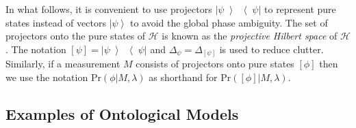 \documentclass[DIV=calc,fontsize=12pt]{scrartcl} %
\theoremstyle{definition}
\theoremstyle{plain}
\newcommand{\Ket}[1]{\ensuremath{\left \vert #1 \right \rangle}}
\newcommand{\KetBra}[2]{\ensuremath{\left \vert #1 \middle \rangle
\middle \langle #2 \right \vert}}
\newcommand{\Proj}[1]{\ensuremath{\left [ #1 \right ]}}
\begin{document}
In what follows, it is convenient to use projectors
$\KetBra{\psi}{\psi}$ to represent pure states instead of vectors
$\Ket{\psi}$ to avoid the global phase ambiguity.  The set of
projectors onto the pure states of $\mathcal{H}$ is known as the
\emph{projective Hilbert space} of $\mathcal{H}$.  The notation
$\Proj{\psi} = \KetBra{\psi}{\psi}$ and $\Delta_{\psi} =
\Delta_{\Proj{\psi}}$ is used to reduce clutter.  Similarly, if a
measurement $M$ consists of projectors onto pure states $\Proj{\phi}$
then we use the notation $\text{Pr}(\phi|M,\lambda)$ as shorthand for
$\text{Pr}(\Proj{\phi}|M,\lambda)$.

\subsection{Examples of Ontological Models}

\label{EOM}
\end{document}
